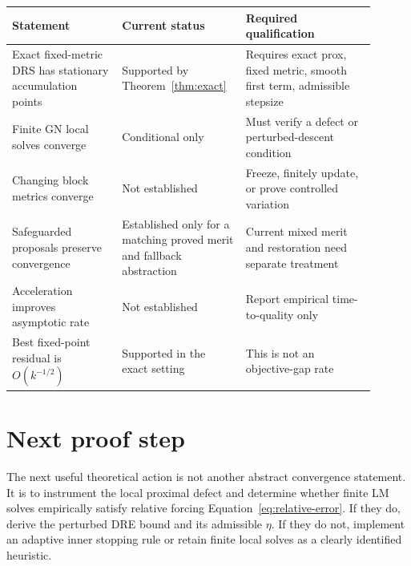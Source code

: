\documentclass[11pt]{article}
\begin{document}
\begin{center}
\begin{tabular}{p{0.29\linewidth}p{0.28\linewidth}p{0.33\linewidth}}
\toprule
Statement & Current status & Required qualification \\
\midrule
Exact fixed-metric DRS has stationary accumulation points
& Supported by Theorem~\ref{thm:exact}
& Requires exact prox, fixed metric, smooth first term, admissible stepsize \\
Finite GN local solves converge
& Conditional only
& Must verify a defect or perturbed-descent condition \\
Changing block metrics converge
& Not established
& Freeze, finitely update, or prove controlled variation \\
Safeguarded proposals preserve convergence
& Established only for a matching proved merit and fallback abstraction
& Current mixed merit and restoration need separate treatment \\
Acceleration improves asymptotic rate
& Not established
& Report empirical time-to-quality only \\
Best fixed-point residual is $O(k^{-1/2})$
& Supported in the exact setting
& This is not an objective-gap rate \\
\bottomrule
\end{tabular}
\end{center}

\section{Next proof step}

The next useful theoretical action is not another abstract convergence
statement.  It is to instrument the local proximal defect and determine whether
finite LM solves empirically satisfy relative forcing
Equation~\eqref{eq:relative-error}.  If they do, derive the perturbed DRE bound
and its admissible $\eta$.  If they do not, implement an adaptive inner stopping
rule or retain finite local solves as a clearly identified heuristic.
\end{document}
